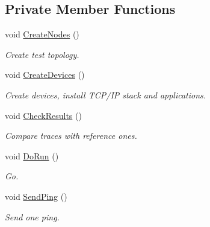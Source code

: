 \subsection*{Private Member Functions}
\begin{DoxyCompactItemize}
\item 
void \hyperlink{classChainRegressionTest_a3e368f839e9527ba7bde784258c31792}{Create\+Nodes} ()
\begin{DoxyCompactList}\small\item\em Create test topology. \end{DoxyCompactList}\item 
void \hyperlink{classChainRegressionTest_ae8b1dd906e3d52a223122c63d236bb19}{Create\+Devices} ()
\begin{DoxyCompactList}\small\item\em Create devices, install T\+C\+P/\+IP stack and applications. \end{DoxyCompactList}\item 
void \hyperlink{classChainRegressionTest_aa865609268ade23e85e6560912fefb57}{Check\+Results} ()
\begin{DoxyCompactList}\small\item\em Compare traces with reference ones. \end{DoxyCompactList}\item 
void \hyperlink{classChainRegressionTest_a51aa3cae551407ee6a6f346c30e3cc43}{Do\+Run} ()
\begin{DoxyCompactList}\small\item\em Go. \end{DoxyCompactList}\item 
void \hyperlink{classChainRegressionTest_a7282b25c193b2b0f237263616b10f251}{Send\+Ping} ()
\begin{DoxyCompactList}\small\item\em Send one ping. \end{DoxyCompactList}\end{DoxyCompactItemize}
